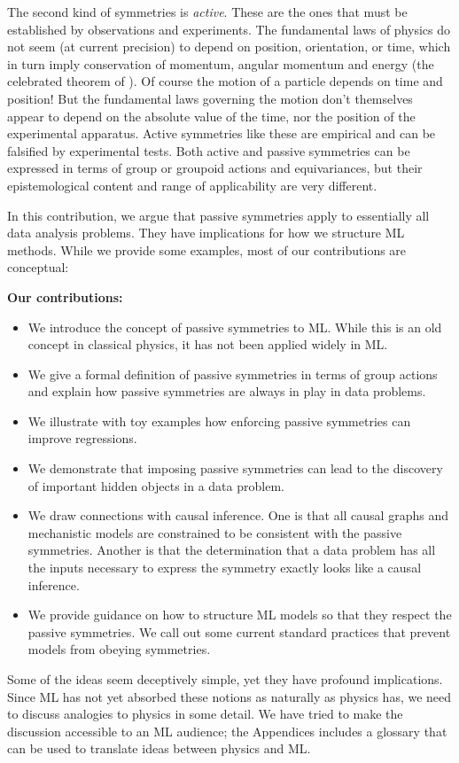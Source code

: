 \documentclass{article}
\theoremstyle{plain}
\theoremstyle{definition}
\theoremstyle{remark}
\begin{document}
The second kind of symmetries is {\em active}.
These are the ones that must be established by observations and experiments.
The fundamental laws of physics do not seem (at current precision) to depend on position, orientation, or time, which in turn imply conservation of momentum, angular momentum and energy (the celebrated theorem of \citealt{noether}).
Of course the motion of a particle depends on time and position! But the fundamental laws governing the motion don't themselves appear to depend on the absolute value of the time, nor the position of the experimental apparatus.
Active symmetries like these are empirical and can be falsified by experimental tests.
Both active and passive symmetries can be expressed in terms of group or groupoid actions and equivariances, but their epistemological content and range of applicability are very different. 

In this contribution, we argue that passive symmetries apply to essentially all data analysis problems.
They have implications for how we structure ML methods. While we provide some examples, most of our contributions are conceptual:

\textbf{Our contributions:}
\vspace{-1.5ex}\begin{itemize}
\parskip
\topsep 0pt
\partopsep 0pt
\parskip 0pt
\item
We introduce the concept of passive symmetries to ML.
While this is an old concept in classical physics, it has not been applied widely in ML.
\item
We give a formal definition of passive symmetries in terms of group actions and explain how passive symmetries are always in play in data problems.
\item
We illustrate with toy examples how enforcing passive symmetries can improve regressions. 
\item
We demonstrate that imposing passive symmetries can lead to the discovery of important hidden objects in a data problem.
\item
We draw connections with causal inference.
One is that all causal graphs and mechanistic models are constrained to be consistent with the passive symmetries.
Another is that the determination that a data problem has all the inputs necessary to express the symmetry exactly looks like a causal inference.
\item 
We provide guidance on how to structure ML models so that they respect the passive symmetries. We call out some current standard practices that prevent models from obeying symmetries. 
\end{itemize}\vspace{-1.5ex}
Some of the ideas seem deceptively simple, yet they have profound implications. Since ML has not yet absorbed these notions as naturally as physics has, we need to discuss analogies to physics in some detail. We have tried to make the discussion accessible to an ML audience; the Appendices includes a glossary that can be used to translate ideas between physics and ML.
\end{document}
